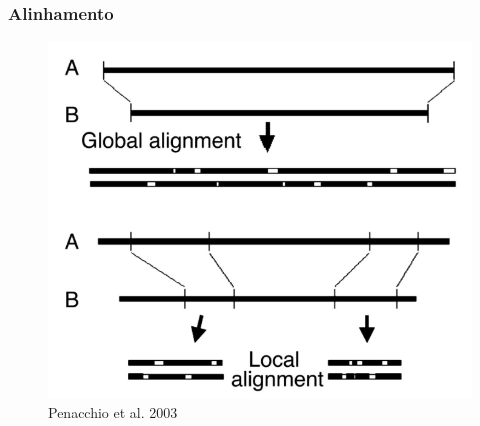 \documentclass{beamer}
\begin{document}
	\begin{frame}\frametitle{Alinhamento}
		\begin{figure}[hbtp]
			\centering
			\includegraphics[scale=0.28]{img/global_local.png}
			\caption{Penacchio et al. 2003}
		\end{figure}
	\end{frame}
\end{document}
